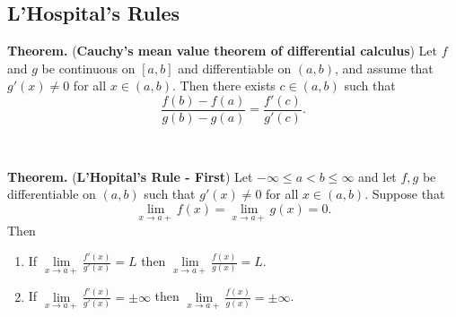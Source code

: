 \documentclass[12pt,a4paper]{article}
\newcommand{\dispsty}{\displaystyle}
\begin{document}
\subsection{L'Hospital's Rules}
\begin{tcolorbox}[colback=white]
	\textbf{Theorem.} (\textbf{Cauchy's mean value theorem of differential calculus}) Let $f$ and $g$ be continuous on $[a,b]$ and differentiable on $(a,b)$, and assume that $g'(x)\neq 0$ for all $x\in(a,b)$. Then there exists $c\in(a,b)$ such that \[
	\frac{f(b)-f(a)}{g(b)-g(a)}=\frac{f'(c)}{g'(c)}.
	\]
\end{tcolorbox}
\
\begin{tcolorbox}[colback=white]
	\textbf{Theorem.} (\textbf{L'Hopital's Rule - First}) Let $-\infty\leq a<b\leq\infty$ and let $f,g$ be differentiable on $(a,b)$ such that $g'(x)\neq 0$ for all $x\in(a,b)$. Suppose that \[
	\lim\limits_{x\to a+}f(x)=\lim\limits_{x\to a+}g(x)=0.
	\] Then \begin{enumerate}
		\item If $\dispsty\lim\limits_{x\to a+}\frac{f'(x)}{g'(x)}=L$ then $\lim\limits_{x\to a+}\dispsty\frac{f(x)}{g(x)}=L$.
		\item If $\dispsty\lim\limits_{x\to a+}\frac{f'(x)}{g'(x)}=\pm\infty$ then $\lim\limits_{x\to a+}\dispsty\frac{f(x)}{g(x)}=\pm\infty$.
	\end{enumerate}
\end{tcolorbox}
\end{document}
